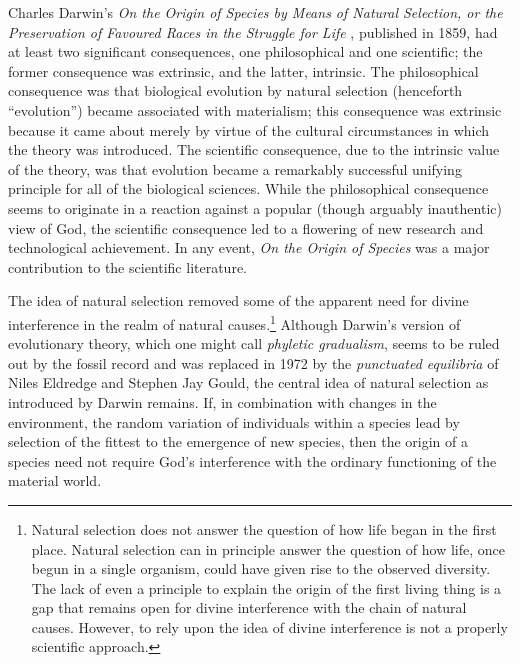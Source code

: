 \documentclass[twocolumn]{article}
\begin{document}
\thispagestyle{fancy}

%
%
%

Charles Darwin's {\it%
   On the Origin of Species by Means of Natural Selection, or the Preservation
   of Favoured Races in the Struggle for Life%
},
published in 1859, had at least two significant consequences, one philosophical
and one scientific; the former consequence was extrinsic, and the latter,
intrinsic. The philosophical consequence was that biological evolution by
natural selection (henceforth ``evolution'') became associated with
materialism; this consequence was extrinsic because it came about merely by
virtue of the cultural circumstances in which the theory was introduced. The
scientific consequence, due to the intrinsic value of the theory, was that
evolution became a remarkably successful unifying principle for all of the
biological sciences. While the philosophical consequence seems to originate in
a reaction against a popular (though arguably inauthentic) view of God, the
scientific consequence led to a flowering of new research and technological
achievement. In any event, {\it On the Origin of Species\/} was a major
contribution to the scientific literature.

The idea of natural selection removed some of the apparent need for divine
interference in the realm of natural causes.\footnote{%
   Natural selection does not answer the question of how life began in the
   first place. Natural selection can in principle answer the question of how
   life, once begun in a single organism, could have given rise to the observed
   diversity. The lack of even a principle to explain the origin of the first
   living thing is a gap that remains open for divine interference with the
   chain of natural causes. However, to rely upon the idea of divine
   interference is not a properly scientific approach.
}
Although Darwin's version of evolutionary theory, which one might call
\emph{phyletic gradualism}, seems to be ruled out by the fossil record and was
replaced in 1972 by the \emph{punctuated equilibria} of Niles Eldredge and
Stephen Jay Gould, the central idea of natural selection as introduced by
Darwin remains.  If, in combination with changes in the environment, the random
variation of individuals within a species lead by selection of the fittest to
the emergence of new species, then the origin of a species need not require
God's interference with the ordinary functioning of the material world.
\end{document}
